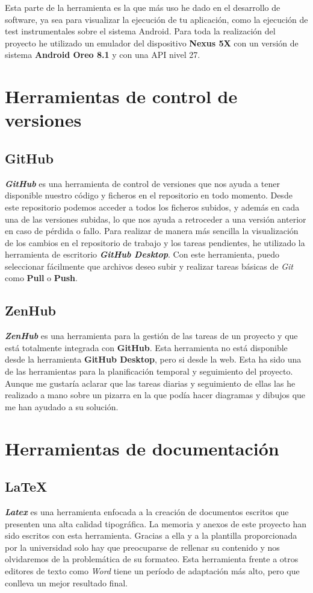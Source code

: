 Esta parte de la herramienta es la que más uso he dado en el desarrollo de software, ya sea para visualizar la ejecución de tu aplicación, como la ejecución de test instrumentales sobre el sistema Android. Para toda la realización del proyecto he utilizado un emulador del dispositivo \textbf{Nexus 5X} con un versión de sistema \textbf{Android Oreo 8.1} y con una API nivel 27.

\section{Herramientas de control de versiones}

\subsection{GitHub}

\textbf{\textit{GitHub}} es una herramienta de control de versiones que nos ayuda a tener disponible nuestro código y ficheros en el repositorio en todo momento. Desde este repositorio podemos acceder a todos los ficheros subidos, y además en cada una de las versiones subidas, lo que nos ayuda a retroceder a una versión anterior en caso de pérdida o fallo. Para realizar de manera más sencilla la visualización de los cambios en el repositorio de trabajo y los tareas pendientes, he utilizado la herramienta de escritorio \textbf{\textit{GitHub Desktop}}. Con este herramienta, puedo seleccionar fácilmente que archivos deseo subir y realizar tareas básicas de \textit{Git} como \textbf{Pull} o \textbf{Push}.

\subsection{ZenHub}
\textbf{\textit{ZenHub}} es una herramienta para la gestión de las tareas de un proyecto y que está totalmente integrada con \textbf{GitHub}. Esta herramienta no está disponible desde la herramienta \textbf{GitHub Desktop}, pero si desde la web. Esta ha sido una de las herramientas para la planificación temporal y seguimiento del proyecto. Aunque me gustaría aclarar que las tareas diarias y seguimiento de ellas las he realizado a mano sobre un pizarra en la que podía hacer diagramas y dibujos que me han ayudado a su solución.

\section{Herramientas de documentación}

\subsection{\LaTeX}

\textbf{\textit{Latex}} es una herramienta enfocada a la creación de documentos escritos que presenten una alta calidad tipográfica. La memoria y anexos de este proyecto han sido escritos con esta herramienta. Gracias a ella y a la plantilla proporcionada por la universidad solo hay que preocuparse de rellenar su contenido y nos olvidaremos de la problemática de su formateo. Esta herramienta frente a otros editores de texto como \textit{Word} tiene un período de adaptación más alto, pero que conlleva un mejor resultado final.
